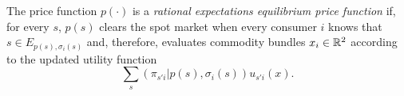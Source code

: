 \begin{defn}
    The price function $p(\cdot)$ is a \emph{rational expectations equilibrium price function} if, for every $s$, $p(s)$ clears the spot market when every consumer $i$ knows that $s \in E_{p(s), \sigma_i(s)}$ and, therefore, evaluates commodity bundles $x_i \in \mathbb{R}^2$ according to the updated utility function 
    \begin{equation*}
        \sum_s \left(\pi_{s'i} | p(s), \sigma_i(s)\right) u_{s'i}(x).
    \end{equation*}
\end{defn}
